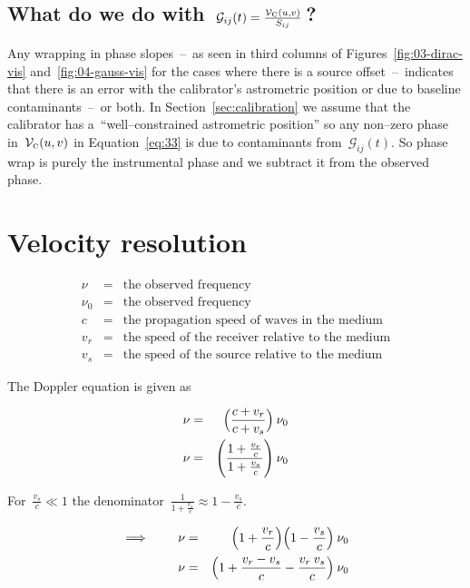 \documentclass[11pt, a4paper]{article}
\newcommand{\msp}{\mkern \medmuskip}
\begin{document}
\subsection{What do we do with~$\mathcal{G}_{ij}(t) = \frac{\mathcal{V}_{\mbox{\tiny C}}(u, v)}{S_{ij}}\msp $?}
Any wrapping in phase slopes~--~as seen in third columns of Figures~\ref{fig:03-dirac-vis} and~\ref{fig:04-gauss-vis} for the cases where there is a source offset~--~indicates that there is an error with the calibrator's astrometric position or due to baseline contaminants~--~or both. In Section~\ref{sec:calibration} we assume that the calibrator has a~``well--constrained astrometric position'' so any non--zero phase in~$\mathcal{V}_{\mbox{\tiny C}}(u, v)$ in Equation~\eqref{eq:33} is due to contaminants from~$\mathcal{G}_{ij}(t)$. So phase wrap is purely the instrumental phase and we subtract it from the observed phase.

\appendix
\appendixpage
\addappheadtotoc

\section{Velocity resolution}

\begin{eqnarray}
  \label{eq:39}
 \nu &=& \mbox{the observed frequency} \nonumber \\
 \nu_0 &=& \mbox{the observed frequency} \nonumber \\
 c &=& \mbox{the propagation speed of waves in the medium} \nonumber \\
 v_r &=& \mbox{the speed of the receiver relative to the medium} \nonumber \\
 v_s &=& \mbox{the speed of the source relative to the medium} \nonumber
\end{eqnarray}

The Doppler equation is given as

\begin{eqnarray}
  \label{eq:35}
  \nu &=& \Big (\frac{c + v _r}{c + v _s} \Big ) \msp \nu_0 \nonumber \\
  \nu &=& \Bigg (\frac{1 + \frac{v _r}{c}}{1 + \frac{v _s}{c}} \Bigg ) \msp \nu_0 \nonumber
\end{eqnarray}

For~$\frac{v _s}{c} \ll 1$ the denominator~$\frac{1}{1+\frac{v _s}{c}} \approx 1 - \frac{v _s}{c}$.

\begin{eqnarray}
  \label{eq:36}
  \implies \qquad \nu &=& \Big (1 + \frac{v _r}{c} \Big ) \Big (1 - \frac{v _s}{c} \Big ) \msp \nu_0 \nonumber \\
  \nu &=& \Big (1 + \frac{v _r - v _s}{c} - \frac{v _r\msp v _s}{c} \Big ) \msp \nu_0 \nonumber
\end{eqnarray}
\end{document}
